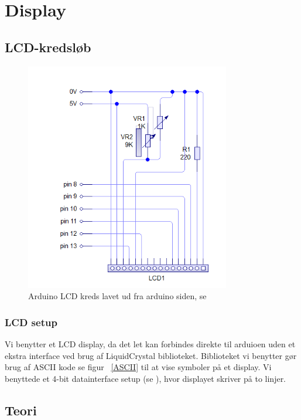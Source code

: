 \section{Display}

\subsection{LCD-kredsløb}
\begin{figure}[H]
	\centering
    \includegraphics[height=10cm]{figures/2_4kredse/LCDkreds.PNG}
	\caption{Arduino LCD kreds lavet ud fra arduino siden, se \cite{arduinoLCD}}
	\label{arduinoLCD}
\end{figure}
\subsubsection{LCD setup}
Vi benytter et LCD display, da det let kan forbindes direkte til arduioen uden et ekstra interface ved brug af LiquidCrystal biblioteket. Biblioteket vi benytter gør brug af ASCII kode se figur ~\ref{ASCII} til at vise symboler på et display.
Vi benyttede et 4-bit datainterface setup (se \cite{arduinoLCD}), hvor displayet skriver på to linjer.




\subsection{Teori}
